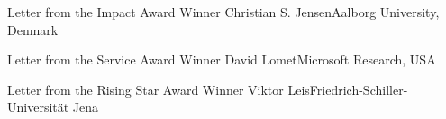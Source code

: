 \documentclass[11pt]{article}
\begin{document}
\begin{bulletin}

\begin{awardsection}
\begin{award}{Letter from the Impact Award Winner}
{Christian S. Jensen}{Aalborg University, Denmark}

\end{award}
\newpage
\begin{award}{Letter from the Service Award Winner}
{David Lomet}{Microsoft Research, USA}

\end{award}
\newpage
\begin{award}{Letter from the Rising Star Award Winner}
{Viktor Leis}{Friedrich-Schiller-Universität Jena}

\end{award}
\end{awardsection}



\begin{callsection}


\end{callsection}
\end{bulletin}
\end{document}
